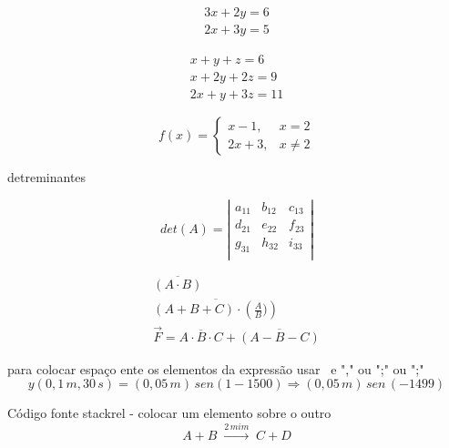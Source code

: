 \documentclass[12pt, a4paper, oneside]{article}
\begin{document}

\begin{eqnarray}
      3x+2y =6\\
      2x+3y = 5
\end{eqnarray}

\vspace{1,0cm}

\begin{eqnarray}
x + y + z = 6\\
  x + 2y + 2z =9\\
  2x + y + 3z = 11
\end{eqnarray}

\vspace{1,0cm}


\begin{equation}
f(x)=
\left\lbrace
\begin{array}{cc}
x - 1, & x = 2 \\
2x +3, & x \neq 2
 \end{array}
\right.
\end{equation}

\vspace{1,0cm}
\begin{center}
detreminantes
\end{center}

\begin{equation}
det(A)= 
\left\vert
\begin{array}{lcr}
a_{11} & b_{12} & c_{13}\\
d_{21} & e_{22} & f_{23}\\
g_{31} & h_{32} & i_{33}\\
\end{array}
\right\vert
\end{equation}

\vspace{1,0cm}

\begin{eqnarray} %
\overline{(A \cdot B)}\\
\overline{( A + B + C) \cdot \left(\frac{A}{B})\right)}\\
\vec{F}= \overline{A \cdot B \cdot C} + \overline{(A-B-C)}
\end{eqnarray}

\vspace{1,0cm}

para colocar espaço ente os elementos da expressão usar \ e "," ou ";" ou ";"
\vspace{1,0cm}
\begin{equation}
y(0,1\,m,30\,s) = (0,05\,m)\,sen(1 - 1500)\Rightarrow (0,05\, m)\,sen\,(-1499)
\end{equation}

\vspace{1,0cm}
Código fonte stackrel - colocar um elemento sobre o outro
\begin{equation} 
A + B \;\stackrel{2\,mim}{\longrightarrow}\;C + D
\end{equation}
\end{document}
